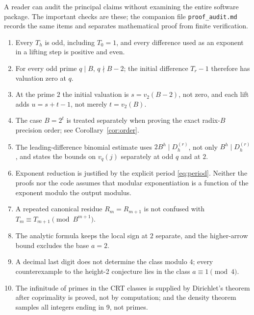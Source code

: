 \documentclass[11pt,letterpaper]{article}
\numberwithin{equation}{section}
\theoremstyle{definition}
\theoremstyle{remark}
\begin{document}
A reader can audit the principal claims without examining the entire software package. The important checks are these; the companion file \texttt{proof\_audit.md} records the same items and separates mathematical proof from finite verification.

\begin{enumerate}[leftmargin=7mm,itemsep=3pt]
\item Every $T_h$ is odd, including $T_0=1$, and every difference used as an exponent in a lifting step is positive and even.
\item For every odd prime $q\mid B$, $q\nmid B-2$; the initial difference $T_r-1$ therefore has valuation zero at $q$.
\item At the prime $2$ the initial valuation is $s=v_2(B-2)$, not zero, and each lift adds $u=s+t-1$, not merely $t=v_2(B)$.
\item The case $B=2^t$ is treated separately when proving the exact radix-$B$ precision order; see Corollary~\ref{cor:order}.
\item The leading-difference binomial estimate uses $2B^h\mid D_h^{(r)}$, not only $B^h\mid D_h^{(r)}$, and states the bounds on $v_q(j)$ separately at odd $q$ and at $2$.
\item Exponent reduction is justified by the explicit period \eqref{eq:period}. Neither the proofs nor the code assumes that modular exponentiation is a function of the exponent modulo the output modulus.
\item A repeated canonical residue $R_m=R_{m+1}$ is not confused with $T_m\equiv T_{m+1}\pmod{B^{m+1}}$.
\item The analytic formula keeps the local sign at $2$ separate, and the higher-arrow bound excludes the base $a=2$.
\item A decimal last digit does not determine the class modulo $4$; every counterexample to the height-2 conjecture lies in the class $a\equiv1\pmod4$.
\item The infinitude of primes in the CRT classes is supplied by Dirichlet's theorem after coprimality is proved, not by computation; and the density theorem samples all integers ending in 9, not primes.
\end{enumerate}
\end{document}
